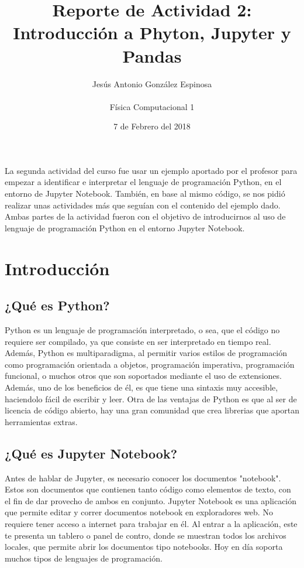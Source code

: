 \documentclass[a4paper]{article}
\title{Reporte de Actividad 2: Introducción a Phyton, Jupyter y Pandas}
\author{Jesús Antonio González Espinosa \\ \\ Física Computacional 1}
\date{7 de Febrero del 2018}
\begin{document}
\maketitle

La segunda actividad del curso fue usar un ejemplo aportado por el profesor para empezar a identificar e interpretar el lenguaje de programación Python, en el entorno de Jupyter Notebook. También, en base al mismo código, se nos pidió realizar unas actividades más que seguían con el contenido del ejemplo dado. Ambas partes de la actividad fueron con el objetivo de introducirnos al uso de lenguaje de programación Python en el entorno Jupyter Notebook. 

\section{Introducción}

\subsection{¿Qué es Python?}
Python es un lenguaje de programación interpretado, o sea, que el código no requiere ser compilado, ya que consiste en ser interpretado en tiempo real. Además, Python es multiparadigma, al permitir varios estilos de programación como programación orientada a objetos, programación imperativa, programación funcional, o muchos otros que son soportados mediante el uso de extensiones. Además, uno de los beneficios de él, es que tiene una sintaxis muy accesible, haciendolo fácil de escribir y leer. Otra de las ventajas de Python es que al ser de licencia de código abierto, hay una gran comunidad que crea librerias que aportan herramientas extras.

\subsection{¿Qué es Jupyter Notebook?}
Antes de hablar de Jupyter, es necesario conocer los documentos "notebook". Estos son documentos que contienen tanto código como elementos de texto, con el fin de dar provecho de ambos en conjunto. 
Jupyter Notebook es una aplicación que permite editar y correr documentos notebook en exploradores web. No requiere tener acceso a internet para trabajar en él. Al entrar a la aplicación, este te presenta un tablero o panel de contro, donde se muestran todos los archivos locales, que permite abrir los documentos tipo notebooks. Hoy en día soporta muchos tipos de lenguajes de programación. 
\end{document}
